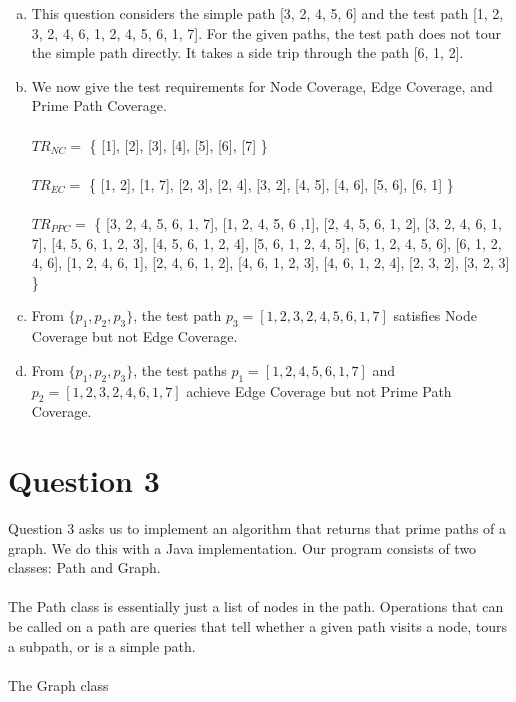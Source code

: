 \documentclass{article}
\begin{document}
\begin{enumerate}[(a)]
	\item This question considers the simple path [3, 2, 4, 5, 6] and the test path [1, 2, 3, 2, 4, 6, 1, 2, 4, 5, 6, 1, 7]. For the given paths, the test path does not tour the simple path directly. It takes a side trip through the path [6, 1, 2].
	\item We now give the test requirements for Node Coverage, Edge Coverage, and Prime Path Coverage. \\\\	
	$TR_{NC} =$ \{ [1], [2], [3], [4], [5], [6], [7] \} \\\\
	$ TR_{EC} =$ \{ [1, 2], [1, 7], [2, 3], [2, 4], [3, 2], [4, 5], [4, 6], [5, 6], [6, 1] \} \\\\
	$TR_{PPC} =$ \{ [3, 2, 4, 5, 6, 1, 7], 
					[1, 2, 4, 5, 6 ,1], 
					[2, 4, 5, 6, 1, 2], 
					[3, 2, 4, 6, 1, 7],
					[4, 5, 6, 1, 2, 3], 
					[4, 5, 6, 1, 2, 4], 
					[5, 6, 1, 2, 4, 5], 
					[6, 1, 2, 4, 5, 6], 
					[6, 1, 2, 4, 6], 
					[1, 2, 4, 6, 1], 
					[2, 4, 6, 1, 2],
					[4, 6, 1, 2, 3], 
					[4, 6, 1, 2, 4], 
					[2, 3, 2], 
					[3, 2, 3] \}

	\item From $ \{ p_1, p_2, p_3 \}$, the test path $p_3 = [1, 2, 3, 2, 4, 5, 6, 1, 7]$ satisfies Node Coverage but not Edge Coverage.
	\item From $ \{ p_1, p_2, p_3 \}$, the test paths 
	$p_1 = [1, 2, 4, 5, 6, 1, 7]$ and  $p_2 = [1, 2, 3, 2, 4, 6, 1, 7]$ achieve Edge Coverage but not Prime Path Coverage.
\end{enumerate}

\newpage
\section*{Question 3}
Question 3 asks us to implement an algorithm that returns that prime paths of a graph. We do this with a Java implementation. Our program consists of two classes: Path and Graph. \\\\
The Path class is essentially just a list of nodes in the path. Operations that can be called on a path are queries that tell whether a given path visits a node, tours a subpath, or is a simple path. \\\\
The Graph class 
\end{document}
